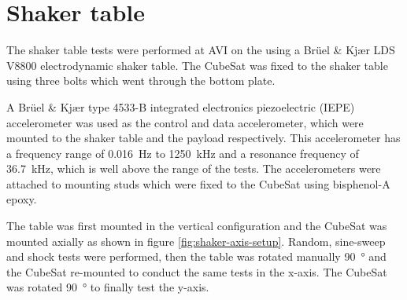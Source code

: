 \documentclass[]{report}
\begin{document}
\section{Shaker table}
\label{sec:shaker-table-method}

The shaker table tests were performed at AVI on the  using a Brüel \& Kjær LDS V8800 electrodynamic shaker table. The CubeSat was fixed to the shaker table using three bolts which went through the bottom plate.

A Brüel \& Kjær type 4533-B integrated electronics piezoelectric (IEPE) accelerometer was used as the control and data accelerometer, which were mounted to the shaker table and the payload respectively. This accelerometer has a frequency range of \SI{0.016}{\hertz} to \SI{1250}{\kilo\hertz} and a resonance frequency of \SI{36.7}{\kilo\hertz}, which is well above the range of the tests. The accelerometers were attached to mounting studs which were fixed to the CubeSat using bisphenol-A epoxy.

The table was first mounted in the vertical configuration and the CubeSat was mounted axially as shown in figure \ref{fig:shaker-axis-setup}. Random, sine-sweep and shock tests were performed, then the table was rotated manually \SI{90}{\degree} and the CubeSat re-mounted to conduct the same tests in the x-axis. The CubeSat was rotated \SI{90}{\degree} to finally test the y-axis.
\end{document}
